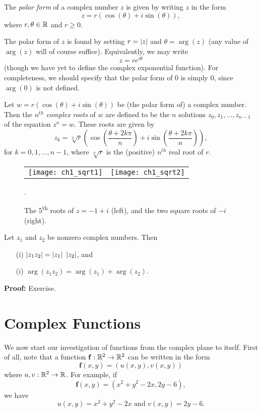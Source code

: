 \begin{definition}
The \emph{polar form} of a complex number $z$ is given by writing $z$ in the form
\[
z = r \left( \cos (\theta) + i \sin (\theta) \right),
\]
where $r , \theta \in \mathbb{R}$ and $r \geq 0$.
\end{definition}
The polar form of $z$ is found by setting $r = \left| z \right|$ and $\theta = \arg (z)$ (any value of $\arg(z)$ will of course suffice).  Equivalently, we may write
\[
z = r e^{i \theta}
\]
(though we have yet to define the complex exponential function).  For completeness, we should specify that the polar form of $0$ is simply $0$, since $\arg (0)$ is not defined.



\begin{definition}
Let $w=r \left( \cos( \theta) + i \sin ( \theta) \right)$ be (the polar form of) a complex number.  Then the $n^{th}$ \emph{complex roots} of $w$ are defined to be the $n$ solutions $z_0, z_1, \ldots , z_{n-1}$ of the equation $z^n = w$.  These roots are given by
\[
z_k = \sqrt[n]{r} \left( \cos \left( \frac{\theta+2k \pi}{n} \right) + i \sin \left( \frac{\theta + 2k\pi}{n} \right) \right),
\]
for $k=0,1,\ldots,n-1$, where $\sqrt[n]{r}$ is the (positive) $n^{th}$ real root of $r$.
\end{definition}


\begin{figure}[H]
\centering
\begin{tabular}{cc}
\texttt{[image: ch1\_sqrt1]} & \texttt{[image: ch1\_sqrt2]}
\end{tabular}
\caption{The 5\textsuperscript{th} roots of $z=-1+i$ (left), and the two square roots of $-i$ (right).}.
\end{figure}


\begin{theorem}
Let $z_1$ and $z_2$ be nonzero complex numbers.  Then
\begin{enumerate}
\item[(i)] $\left| z_1z_2 \right|=\left| z_1 \right| \ \left| z_2 \right|$, and
\item[(i)] $\arg (z_1z_2)=\arg(z_1)+\arg(z_2)$.
\end{enumerate}
\end{theorem}
{\bf Proof:} Exercise.


\section{Complex Functions}

We now start our investigation of functions from the complex plane to itself.  First of all, note that a function $\mathbf{f}:\mathbb{R}^2 \to \mathbb{R}^2$ can be written in the form
\[
\mathbf{f}(x,y)=\left( u(x,y), v (x,y) \right)
\]
where $u,v:\mathbb{R}^2 \to \mathbb{R}$.  For example, if
\[
\mathbf{f}(x,y)=\left(x^2+y^2-2x,2y-6 \right),
\]
we have
\[
u(x,y)=x^2+y^2-2x \text{ and } v(x,y)= 2y-6.
\]





